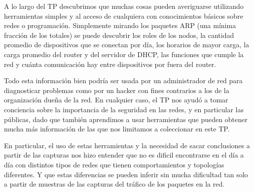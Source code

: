 A lo largo del TP descubrimos que muchas cosas pueden averiguarse utilizando
herramientas simples y al acceso de cualquiera con conocimientos básicos sobre
redes o programación. Simplemente mirando los paquetes ARP (una mínima fracción
de los totales) se puede descubrir los roles de los nodos, la cantidad promedio
de dispositivos que se conectan por día, los horarios de mayor carga, la carga
promedio del router y del servidor de DHCP, las funciones que cumple la red y
cuánta comunicación hay entre dispositivos por fuera del router.

Todo esta información bien podría ser usada por un administrador de red para
diagnosticar problemas como por un hacker con fines contrarios a los
de la organización dueña de la red. En cualquier caso, el TP nos ayudó a tomar
conciencia sobre la importancia de la seguridad en las redes, y en particular
las públicas, dado que también aprendimos a usar herramientas que pueden obtener
mucha más información de las que nos limitamos a coleccionar en este TP.

En particular, el uso de estas herramientas y la necesidad de sacar conclusiones a partir de las capturas nos hizo entender que no es dificil encontrarse en el día a día con distintos tipos de redes que tienen comportamientos y topologías diferentes. Y que estas diferencias se pueden inferir sin mucha dificultad tan solo a partir de muestras de las capturas del tráfico de los paquetes en la red.
